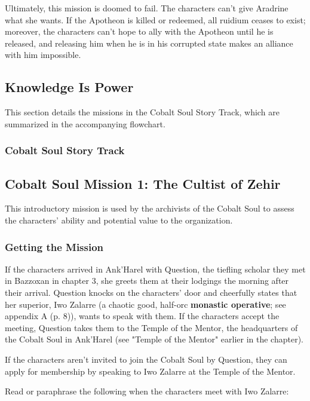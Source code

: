 \documentclass[a4paper, 11pt, bg=full, twocolumn, nooutline]{dndbook}
\begin{document}
Ultimately, this mission is doomed to fail. The characters can't give Aradrine what she wants. If the Apotheon is killed or redeemed, all ruidium ceases to exist; moreover, the characters can't hope to ally with the Apotheon until he is released, and releasing him when he is in his corrupted state makes an alliance with him impossible.

\subsection{Knowledge Is Power}

This section details the missions in the Cobalt Soul Story Track, which are summarized in the accompanying flowchart.

\subsubsection{Cobalt Soul Story Track}



\subsection{Cobalt Soul Mission 1: The Cultist of Zehir}

This introductory mission is used by the archivists of the Cobalt Soul to assess the characters' ability and potential value to the organization.

\subsubsection{Getting the Mission}

If the characters arrived in Ank'Harel with Question, the tiefling scholar they met in Bazzoxan in chapter 3, she greets them at their lodgings the morning after their arrival. Question knocks on the characters' door and cheerfully states that her superior, Iwo Zalarre (a chaotic good, half-orc \textbf{monastic operative}; see appendix A (p. 8)), wants to speak with them. If the characters accept the meeting, Question takes them to the Temple of the Mentor, the headquarters of the Cobalt Soul in Ank'Harel (see "Temple of the Mentor" earlier in the chapter).

If the characters aren't invited to join the Cobalt Soul by Question, they can apply for membership by speaking to Iwo Zalarre at the Temple of the Mentor.

Read or paraphrase the following when the characters meet with Iwo Zalarre:
\end{document}
